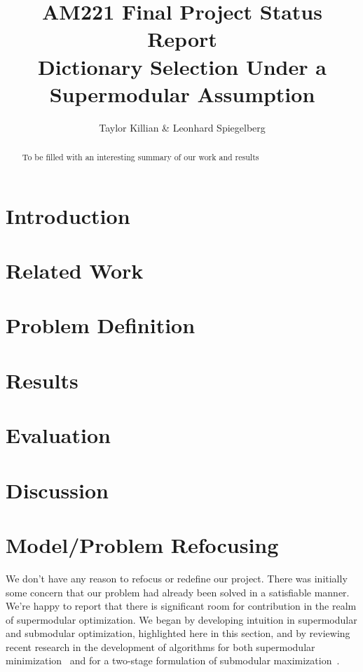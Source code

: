 \documentclass{article}
\begin{document}
\title{AM221 Final Project Status Report \\ \large Dictionary Selection Under a Supermodular Assumption}
\author{Taylor Killian \& Leonhard Spiegelberg}
\maketitle

\begin{abstract}
To be filled with an interesting summary of our work and results

\end{abstract}

\section{Introduction}\label{sec:intro}

\section{Related Work}\label{sec:prior-work}

\section{Problem Definition}\label{sec:problem}

\section{Results}\label{sec:results}

\section{Evaluation}\label{sec:eval}

\section{Discussion}\label{sec:discuss}


\section{Model/Problem Refocusing} \label{model}
We don't have any reason to refocus or redefine our project. There was initially some concern that our problem had already been solved in a satisfiable manner. We're happy to report that there is significant room for contribution in the realm of supermodular optimization. We began by developing intuition in supermodular and submodular optimization, highlighted here in this section, and by reviewing recent research in the development of algorithms for both supermodular minimization~\cite{BoutsidisLS15} and for a two-stage formulation of submodular maximization~\cite{Singer16TwoStage}. 
\\
\end{document}

